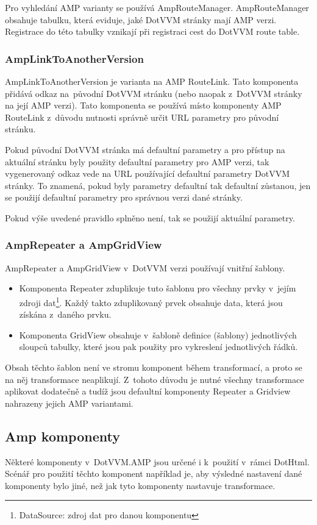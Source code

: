 Pro vyhledání AMP varianty se používá AmpRouteManager. AmpRouteManager obsahuje tabulku, která eviduje, jaké DotVVM stránky mají AMP verzi. Registrace do této tabulky vznikají při registraci cest do DotVVM route table.

\subsubsection*{AmpLinkToAnotherVersion}
AmpLinkToAnotherVersion je varianta na AMP RouteLink. Tato komponenta přidává odkaz na~původní DotVVM stránku (nebo naopak z~DotVVM stránky na její AMP verzi). Tato komponenta se používá místo komponenty AMP RouteLink z~důvodu nutnosti správně určit URL parametry pro původní stránku.

Pokud původní DotVVM stránka má defaultní parametry a pro přístup na aktuální stránku byly použity defaultní parametry pro AMP verzi, tak vygenerovaný odkaz vede na URL používající defaultní parametry DotVVM stránky. To znamená, pokud byly parametry defaultní tak defaultní zůstanou, jen se použijí defaultní parametry pro správnou verzi dané stránky.

Pokud výše uvedené pravidlo splněno není, tak se použijí aktuální parametry.

\subsubsection*{AmpRepeater a AmpGridView}
AmpRepeater a AmpGridView v~DotVVM verzi používají vnitřní šablony.

\begin{itemize}
    \item Komponenta Repeater zduplikuje tuto šablonu pro všechny prvky v~jejím zdroji dat\footnote{DataSource: zdroj dat pro danou komponentu}. Každý takto zduplikovaný prvek obsahuje data, která jsou získána z~daného prvku.
    \item Komponenta GridView obsahuje v~šabloně definice (šablony) jednotlivých sloupců tabulky, které jsou pak použity pro vykreslení jednotlivých řádků.
\end{itemize}

Obsah těchto šablon není ve stromu komponent během transformací, a proto se na něj transformace neaplikují. Z~tohoto důvodu je nutné všechny transformace aplikovat dodatečně a tudíž jsou defaultní komponenty Repeater a Gridview nahrazeny jejich AMP variantami.

\subsection*{Amp komponenty}
 Některé komponenty v~DotVVM.AMP jsou určené i k~použití v~rámci DotHtml. Scénář pro použití těchto komponent například je, aby výsledné nastavení dané komponenty bylo jiné, než jak tyto komponenty nastavuje transformace.
